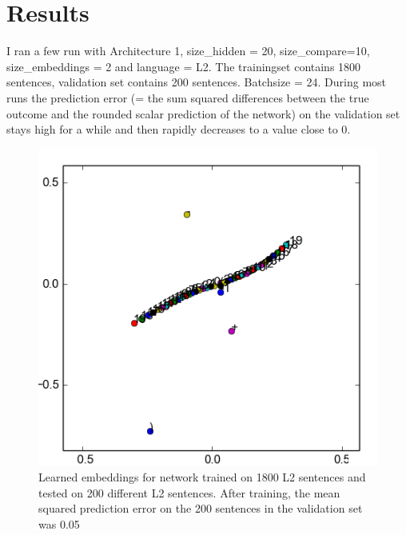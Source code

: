 \documentclass{article}
\begin{document}
\section{Results}

I ran a few run with Architecture 1, size\_hidden = 20, size\_compare=10, size\_embeddings = 2 and language = L2. The trainingset contains 1800 sentences, validation set contains 200 sentences. Batchsize = 24. During most runs the prediction error (= the sum squared differences between the true outcome and the rounded scalar prediction of the network) on the validation set stays high for a while and then rapidly decreases to a value close to 0. 

\begin{figure}
        \includegraphics[scale=0.9]{L2_embeddings.png}
    \caption{Learned embeddings for network trained on 1800 L2 sentences and tested on 200 different L2 sentences. After training, the mean squared prediction error on the 200 sentences in the validation set was 0.05}
\end{figure}
\end{document}
